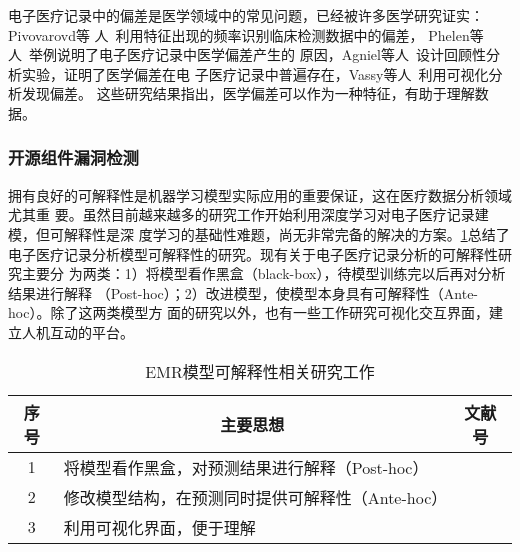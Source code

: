 电子医疗记录中的偏差是医学领域中的常见问题，已经被许多医学研究证实：Pivovarovd等
人~利用特征出现的频率识别临床检测数据中的偏差，
Phelen等人~举例说明了电子医疗记录中医学偏差产生的
原因，Agniel等人~设计回顾性分析实验，证明了医学偏差在电
子医疗记录中普遍存在，Vassy等人~利用可视化分析发现偏差。
这些研究结果指出，医学偏差可以作为一种特征，有助于理解数据。

{}

\subsubsection{开源组件漏洞检测}

拥有良好的可解释性是机器学习模型实际应用的重要保证，这在医疗数据分析领域尤其重
要。虽然目前越来越多的研究工作开始利用深度学习对电子医疗记录建模，但可解释性是深
度学习的基础性难题，尚无非常完备的解决的方案。\cref{tab:interpretability}总结了
电子医疗记录分析模型可解释性的研究。现有关于电子医疗记录分析的可解释性研究主要分
为两类：1）将模型看作黑盒（black-box），待模型训练完以后再对分析结果进行解释
（Post-hoc）；2）改进模型，使模型本身具有可解释性（Ante-hoc）。除了这两类模型方
面的研究以外，也有一些工作研究可视化交互界面，建立人机互动的平台。

\begin{table}
    \renewcommand\arraystretch{1.5}
    \begin{small}
        \caption{EMR模型可解释性相关研究工作}
        \label{tab:interpretability}
        \begin{center}
            \begin{tabular}[c]{cll}
                \toprule
                \multicolumn{1}{c}{\textbf{序号}} &
                \multicolumn{1}{c}{\textbf{主要思想}} &
                \multicolumn{1}{c}{\textbf{文献号}}\\
                \midrule
                1 & 将模型看作黑盒，对预测结果进行解释（Post-hoc） & \cite{panigutti2019explaining}
                \cite{panigutti2020doctor} \\
                2 & 修改模型结构，在预测同时提供可解释性（Ante-hoc） &
                \cite{choi2016retain} \cite{ma2017dipole} \cite{bai2018interpretable}
                \cite{gao2019camp} \cite{ma2019adacare} \\
                3 & 利用可视化界面，便于理解 & \cite{kwon2018retainvis} \cite{jin2020carepre}
                \cite{guo2020comparative} \\
                \bottomrule
            \end{tabular}
        \end{center}
    \end{small}
\end{table}

